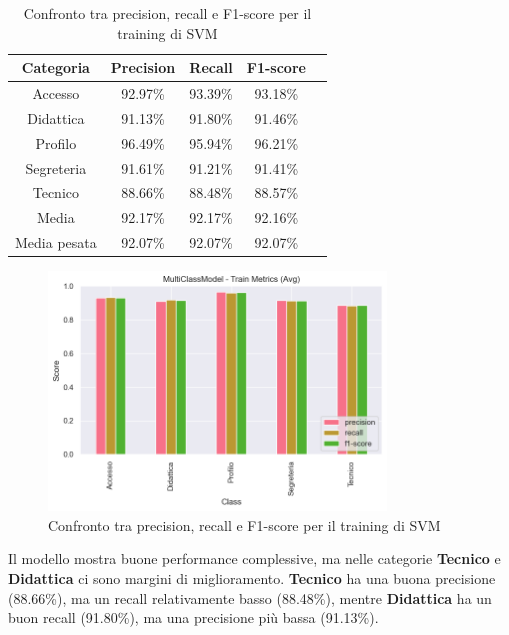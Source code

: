 \begin{table}[H]
    \centering
    \begin{tabular}{|c|c|c|c|c|}
        \hline
        \textbf{Categoria} & \textbf{Precision} & \textbf{Recall} & \textbf{F1-score} \\
        \hline
        Accesso & 92.97\% & 93.39\% & 93.18\% \\
        \hline
        Didattica & 91.13\% & 91.80\% & 91.46\% \\
        \hline
        Profilo & 96.49\% & 95.94\% & 96.21\% \\
        \hline
        Segreteria & 91.61\% & 91.21\% & 91.41\% \\
        \hline
        Tecnico & 88.66\% & 88.48\% & 88.57\% \\
        \hline
        Media & 92.17\% & 92.17\% & 92.16\% \\
        \hline
        Media pesata & 92.07\% & 92.07\% & 92.07\% \\
        \hline
    \end{tabular}
    \caption{Confronto tra precision, recall e F1-score per il training di SVM}
    \label{tab:metriche_svm_train}
\end{table}

\begin{figure}[H]
    \centering
    \includegraphics[width=0.8\textwidth]{images/metrics_train_svm.png}
    \caption{Confronto tra precision, recall e F1-score per il training di SVM}
    \label{fig:metrics_train_svm}
\end{figure}

Il modello mostra buone performance complessive, ma nelle categorie \textbf{Tecnico} e \textbf{Didattica} ci sono margini di miglioramento. \textbf{Tecnico} ha una buona precisione (88.66\%), ma un recall relativamente basso (88.48\%), mentre \textbf{Didattica} ha un buon recall (91.80\%), ma una precisione più bassa (91.13\%).

